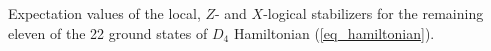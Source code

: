 \begin {table*}
\begin{center}
{\begin{tabular}{c @{\ }@{\ }|@{\ }@{\ } c }
\end{tabular}}
    \egroup
    \end{center}\caption{Expectation values of the local, $Z$- and $X$-logical stabilizers for the remaining eleven of the 22 ground states of $D_4$ Hamiltonian (\ref{eq_hamiltonian}). }\label{table:22_gss_b}\end {table*}
        
